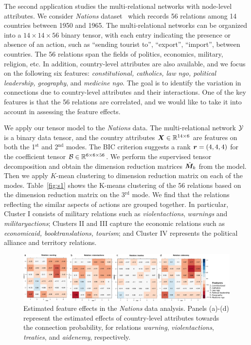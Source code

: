 \documentclass[12pt]{article}
\theoremstyle{definition}
\theoremstyle{definition}
\begin{document}
The second application studies the multi-relational networks with node-level attributes. We consider \emph{Nations} dataset~\citep{nickel2011three} which records 56 relations among 14 countries between 1950 and 1965. The multi-relational networks can be organized into a $14 \times 14 \times 56$ binary tensor, with each entry indicating the presence or absence of an action, such as ``sending tourist to'', ``export'', ``import'', between countries. The 56 relations span the fields of politics, economics, military, religion, etc. In addition, country-level attributes are also available, and we focus on the following six features: \emph{constitutional, catholics, law ngo, political leadership, geography}, and \emph{medicine ngo}. The goal is to identify the variation in connections due to country-level attributes and their interactions. One of the key features is that the 56 relations are correlated, and we would like to take it into account in assessing the feature effects. 

We apply our tensor model to the \emph{Nations} data. The multi-relational network $\mathcal{Y}$ is a binary data tensor, and the country attributes $\bm X\in\mathbb{R}^{14\times 6}$ are features on both the 1$^\text{st}$ and 2$^\text{nd}$ modes. The BIC criterion suggests a rank $\bm{r}=(4,4,4)$ for the coefficient tensor $\mathcal{B}\in\mathbb{R}^{6\times 6 \times 56}$. 
We perform the supervised tensor decomposition and obtain the dimension reduction matrices $\hat {\bm M}_k$ from the model. Then we apply $K$-mean clustering to dimension reduction matrix on each of the modes. Table~\ref{fig:s1} shows the K-means clustering of the 56 relations based on the dimension reduction matrix on the 3$^\text{rd}$ mode. We find that the relations reflecting the similar aspects of actions are grouped together. In particular, Cluster I consists of military relations such as \emph{violentactions}, \emph{warnings} and \emph{militaryactions}; Clusters II and III capture the economic relations such as \emph{economicaid, booktranslations, tourism}; and Cluster IV represents the political alliance and territory relations. 

\begin{figure}[!h]
\centering
\includegraphics[width=16cm]{coef.pdf}
\caption{Estimated feature effects in the \emph{Nations} data analysis. Panels (a)-(d) represent the estimated effects of country-level attributes towards the connection probability, for relations \emph{warning}, \emph{violentactions}, \emph{treaties}, and \emph{aidenemy}, respectively. }\label{fig:est}
\end{figure}
\end{document}
